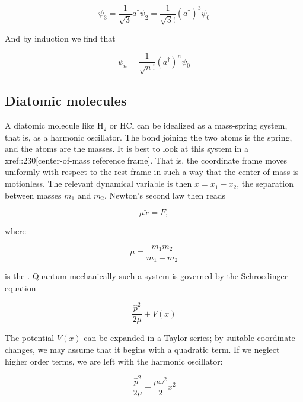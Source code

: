 \begin{equation}
\psi_3 = \frac{1}{\sqrt 3} a^\dagger \psi_2 =  \frac{1}{\sqrt 3!} ( a^\dagger )^3 \psi_0
\end{equation}

And by induction we find that

\begin{equation}
\psi_n =  \frac{1}{\sqrt n!} ( a^\dagger )^n \psi_0
\end{equation}


\subsection{Diatomic molecules}



A diatomic molecule like $\text{H}_2$ or $\text{HCl}$ can be idealized as a mass-spring system, that is, as a harmonic oscillator.  The bond joining the two atoms is the spring, and the atoms are the masses.  It is best to look at this system in a xref::230[center-of-mass reference frame]. That is, the coordinate frame moves uniformly with respect to the rest frame in such a way that the center of mass is motionless. The relevant dynamical variable is then $x = x_1 - x_2$, the separation between masses $m_1$ and $m_2$.  Newton's second law then reads

\begin{equation}
\mu \ddot x = F,
\end{equation}

where 

\begin{equation}
\mu = \frac{m_1m_2}{m_1 + m_2}
\end{equation}

is the .  Quantum-mechanically such a system is governed by the Schroedinger equation 

\begin{equation}
\frac{\hat p^2 }{2\mu} + V(x)
\end{equation}

The potential $V(x)$ can be expanded in a Taylor series; by suitable coordinate changes, we may assume that it begins with a quadratic term.  If we neglect higher order terms, we are left with the harmonic oscillator:
 

\begin{equation}
\frac{\hat p^2 }{2\mu} + \frac{\mu\omega^2 }{2} x^2
\end{equation}

